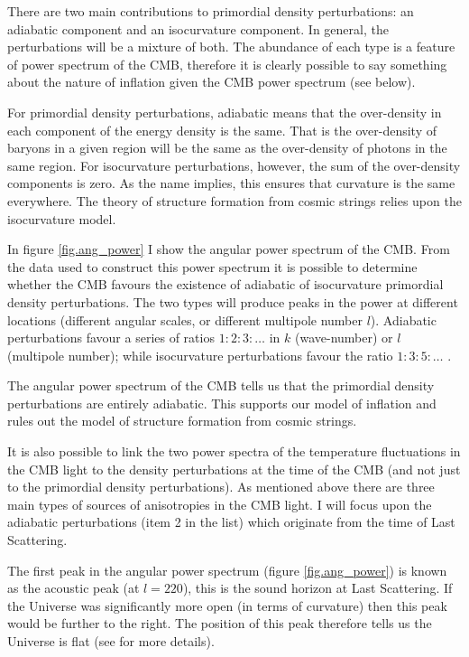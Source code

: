 There are two main contributions to primordial density perturbations: an adiabatic component and an isocurvature component. In general, the perturbations will be a mixture of both. The abundance of each type is a feature of power spectrum of the CMB, therefore it is clearly possible to say something about the nature of inflation given the CMB power spectrum (see below).

For primordial density perturbations, adiabatic means that the over-density in each component of the energy density is the same. That is the over-density of baryons in a given region will be the same as the over-density of photons in the same region. For isocurvature perturbations, however, the sum of the over-density components is zero. As the name implies, this ensures that curvature is the same everywhere. The theory of structure formation from cosmic strings relies upon the isocurvature model.

In figure \ref{fig.ang_power} I show the angular power spectrum of the CMB. From the data used to construct this power spectrum it is possible to determine whether the CMB favours the existence of adiabatic of isocurvature primordial density perturbations. The two types will produce peaks in the power at different locations (different angular scales, or different multipole number $l$). Adiabatic perturbations favour a series of ratios $1:2:3: \ldots$ in $k$ (wave-number) or $l$ (multipole number); while isocurvature perturbations favour the ratio $1:3:5: \ldots$ \citep{bib_huw2}.

The angular power spectrum of the CMB tells us that the primordial density perturbations are entirely adiabatic. This supports our model of inflation and rules out the model of structure formation from cosmic strings.

It is also possible to link the two power spectra of the temperature fluctuations in the CMB light to the density perturbations at the time of the CMB (and not just to the primordial density perturbations). As mentioned above there are three main types of sources of anisotropies in the CMB light. I will focus upon the adiabatic perturbations (item 2 in the list) which originate from the time of Last Scattering.

The first peak in the angular power spectrum (figure \ref{fig.ang_power}) is known as the acoustic peak (at $l = 220$), this is the sound horizon at Last Scattering. If the Universe was significantly more open (in terms of curvature) then this peak would be further to the right. The position of this peak therefore tells us the Universe is flat (see \citet{bib_pea} for more details).


